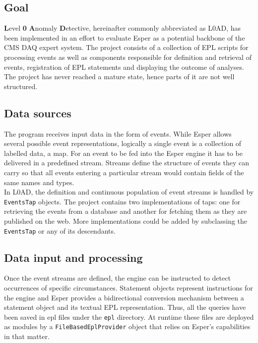 \subsection {Goal}
\textbf{L}evel \textbf{0} \textbf{A}nomaly \textbf{D}etective, hereinafter commonly abbreviated as L0AD, has been implemented in an effort to evaluate Esper as a potential backbone of the CMS DAQ expert system. The project consists of a collection of EPL scripts for processing events as well as components responsible for definition and retrieval of events, registration of EPL statements and displaying the outcome of analyses.
The project has never reached a mature state, hence parts of it are not well structured.

\subsection{Data sources}
The program receives input data in the form of events. While Esper allows several possible event representations, logically a single event is a collection of labelled data, a map. For an event to be fed into the Esper engine it has to be delivered in a predefined stream. Streams define the structure of events they can carry so that all events entering a particular stream would contain fields of the same names and types. \\

In L0AD, the definition and continuous population of event streams is handled by \texttt{EventsTap} objects. The project contains two implementations of taps: one for retrieving the events from a database and another for fetching them as they are published on the web. More implementations could be added by subclassing the \texttt{EventsTap} or any of its descendants.

\subsection{Data input and processing}

Once the event streams are defined, the engine can be instructed to detect occurrences of specific circumstances. Statement objects represent instructions for the engine and Esper provides a bidirectional conversion mechanism between a statement object and its textual EPL representation. Thus, all the queries have been saved in epl files under the \texttt{epl} directory. At runtime these files are deployed as modules by a \texttt{FileBasedEplProvider} object that relies on Esper's capabilities in that matter. 

